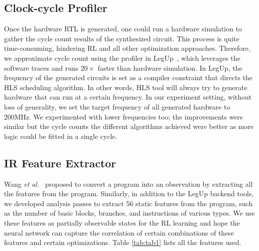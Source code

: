 \subsection{Clock-cycle Profiler}
Once the hardware RTL is generated, one could run a hardware simulation to gather the cycle count results of the synthesized circuit. This process is quite time-consuming, hindering RL and all other optimization approaches. Therefore, we approximate cycle count using the profiler in LegUp~\cite{huang2013effect}, which leverages the software traces and runs $20\times$ faster than hardware simulation. 
In LegUp, the frequency of the generated circuits is set as a compiler constraint that directs the HLS scheduling algorithm. In other words, HLS tool will always try to generate hardware that can run at a certain frequency. In our experiment setting, without loss of generality, we set the target frequency of all generated hardware to 200MHz. We experimented with lower frequencies too; the improvements were similar but the cycle counts the different algorithms achieved were better as more logic could be fitted in a single cycle. 

\subsection{IR Feature Extractor}
Wang \textit{et al.}~\cite{wang2018} proposed to convert a program into an observation by extracting all the features from the program. Similarly, in addition to the LegUp backend tools, we developed analysis passes to extract 56 static features from the program, such as the number of basic blocks, branches, and instructions of various types. 
We use these features as partially observable states for the RL learning and hope the neural network can capture the correlation of certain combinations of these features and certain optimizations. Table \ref{tab:tab1} lists all the features used.

